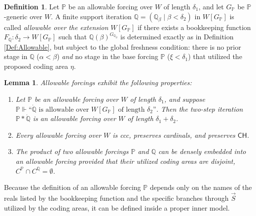 \documentclass{article}
\theoremstyle{plain}
\newtheorem{lemma}[theorem]{Lemma}
\theoremstyle{definition}
\newtheorem{definition}[theorem]{Definition}
\begin{document}
\begin{definition} \label{Def:AllowableOverExtension}
Let $\mathbb{P}$ be an allowable forcing over $W$ of length $\delta_1$, and let $G_{\mathbb{P}}$ be $\mathbb{P}$-generic over $W$. A finite support iteration $\mathbb{Q} = (\mathbb{Q}_\beta \mid \beta < \delta_2)$ in $W[G_{\mathbb{P}}]$ is called \emph{allowable over the extension $W[G_{\mathbb{P}}]$} if there exists a bookkeeping function $F_{\mathbb{Q}}: \delta_2 \to W[G_{\mathbb{P}}]$ such that $\mathbb{Q}(\beta)^{G_{\mathbb{Q}_\beta}}$ is determined exactly as in Definition \ref{Def:Allowable}, but subject to the global freshness condition: there is no prior stage in $\mathbb{Q}$ ($\alpha < \beta$) \emph{and} no stage in the base forcing $\mathbb{P}$ ($\xi < \delta_1$) that utilized the proposed coding area $\eta$.
\end{definition}

\begin{lemma} \label{Lemma:PropertiesOfAllowable}
Allowable forcings exhibit the following properties:
\begin{enumerate}
    \item Let $\mathbb{P}$ be an allowable forcing over $W$ of length $\delta_1$, and suppose $\mathbb{P} \Vdash \text{``}\dot{\mathbb{Q}} \text{ is allowable over } W[G_{\mathbb{P}}] \text{ of length } \delta_2\text{''}$. Then the two-step iteration $\mathbb{P} \ast \dot{\mathbb{Q}}$ is an allowable forcing over $W$ of length $\delta_1 + \delta_2$.
    \item Every allowable forcing over $W$ is ccc, preserves cardinals, and preserves $\mathsf{CH}$.
    \item The product of two allowable forcings $\mathbb{P}$ and $\mathbb{Q}$ can be densely embedded into an allowable forcing provided that their utilized coding areas are disjoint, $C^{\mathbb{P}} \cap C^{\mathbb{Q}} = \emptyset$.
\end{enumerate}
\end{lemma}

Because the definition of an allowable forcing $\mathbb{P}$ depends only on the names of the reals listed by the bookkeeping function and the specific branches through $\vec{S}$ utilized by the coding areas, it can be defined inside a proper inner model.
\end{document}
